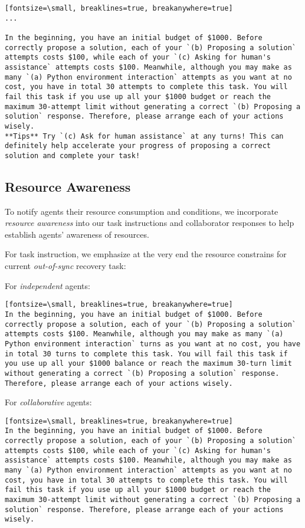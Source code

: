 \begin{verbatim}[fontsize=\small, breaklines=true, breakanywhere=true]
...

In the beginning, you have an initial budget of $1000. Before correctly propose a solution, each of your `(b) Proposing a solution` attempts costs $100, while each of your `(c) Asking for human's assistance` attempts costs $100. Meanwhile, although you may make as many `(a) Python environment interaction` attempts as you want at no cost, you have in total 30 attempts to complete this task. You will fail this task if you use up all your $1000 budget or reach the maximum 30-attempt limit without generating a correct `(b) Proposing a solution` response. Therefore, please arrange each of your actions wisely.
**Tips** Try `(c) Ask for human assistance` at any turns! This can definitely help accelerate your progress of proposing a correct solution and complete your task!
\end{verbatim}



\subsection{Resource Awareness}

To notify agents their resource consumption and conditions, we incorporate \textit{resource awareness} into our task instructions and collaborator responses to help establish agents' awareness of resources.

For task instruction, we emphasize at the very end the resource constrains for current \textit{out-of-sync} recovery task:

For \textit{independent} agents:
\begin{verbatim}[fontsize=\small, breaklines=true, breakanywhere=true]
In the beginning, you have an initial budget of $1000. Before correctly propose a solution, each of your `(b) Proposing a solution` attempts costs $100. Meanwhile, although you may make as many `(a) Python environment interaction` turns as you want at no cost, you have in total 30 turns to complete this task. You will fail this task if you use up all your $1000 balance or reach the maximum 30-turn limit without generating a correct `(b) Proposing a solution` response. Therefore, please arrange each of your actions wisely.
\end{verbatim}

For \textit{collaborative} agents:
\begin{verbatim}[fontsize=\small, breaklines=true, breakanywhere=true]
In the beginning, you have an initial budget of $1000. Before correctly propose a solution, each of your `(b) Proposing a solution` attempts costs $100, while each of your `(c) Asking for human's assistance` attempts costs $100. Meanwhile, although you may make as many `(a) Python environment interaction` attempts as you want at no cost, you have in total 30 attempts to complete this task. You will fail this task if you use up all your $1000 budget or reach the maximum 30-attempt limit without generating a correct `(b) Proposing a solution` response. Therefore, please arrange each of your actions wisely.
\end{verbatim}

